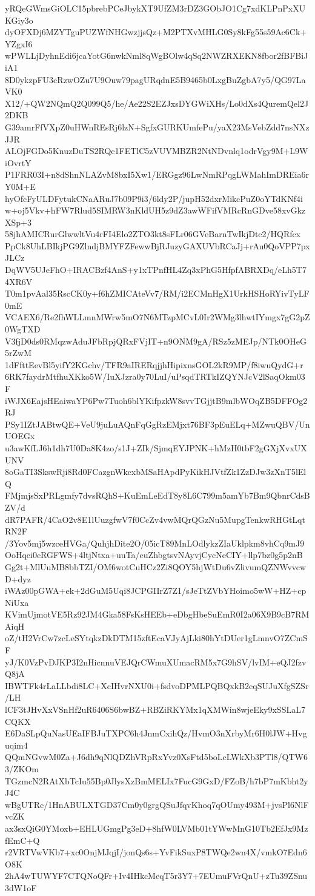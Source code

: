 yRQeGWmsGiOLC15pbrebPCeJbykXT9UfZM3rDZ3GObJO1Cg7xdKLPnPxXUKGiy3o
dyOFXDj6MZYTguPUZWfNHGwzjjsQz+M2PTXvMHLG0Sy8kFg55s59Ac6Ck+YZgxI6
wPWLLjDyhnEdi6jcaYotG6nwkNml8qWgBOlw4qSq2NWZRXEKN8fbor2fBFBiJiA1
8D0ykzpFU3cRzwOZu7U9Ouw79pagURqdnE5B9465b0LxgBuZgbA7y5/QG97LaVK0
X12/+QW2NQmQ2Q099Q5/he/Ae22S2EZJxsDYGWiXHs/Lo0dXs4QuremQel2J2DKB
G39amrFfVXpZ0uHWnREsRj6lzN+SgfxGURKUmfePu/yaX23MsVebZdd7nsNXzJJR
ALOjFGDo5KnuzDuTS2RQc1FETlC5zVUVMBZR2NtNDvnlq1odrVgy9M+L9WiOvrtY
P1FRR03I+n8dShnNLAZvM8bxI5Xw1/ERGgz96LwNmRPqgLWMahImDREia6rY0M+E
hyOfcFyULDFytukCNaARuJ7b09P9i3/6ldy2P/jupH52dxrMikcPuZ0oYTdKNf4i
w+oj5Vkv+hFW7Rlud5SIMRW3nKldUH5z9dZ3awWFifVMRcRnGDve58xvGkzXSp+3
58jhAMICRurGlwwltVu4rFI4Elo2ZTO3kt8sFLr06GVeBarnTwIkjDtc2/HQRfcx
PpCk8UhLBIkjPG9ZlndjBMYFZFewwBjRJuzyGAXUVbRCaJj+rAu0QoVPP7pxJLCz
DqWV5UJeFhO+IRACBzf4AnS+y1xTPnfHL4Zq3xPhG5HfpfABRXDq/eLh5T74XR6V
T0m1pvAal35RscCK0y+f6hZMICAteVv7/RM/i2ECMnHgX1UrkHSHoRYivTyLF0mE
VCAEX6/Re2fhWLLmnMWrw5mO7N6MTzpMCvL0Ir2WMg3lhwtIYmgx7gG2pZ0WgTXD
V3fjD0ds0RMqzwAduJFbRpjQRxFVjIT+n9ONM9gA/RSz5zMEJp/NTk0OHeG5rZwM
1dFfttEevBl5yifY2KGchv/TFR9aIRERqjjhHipixnsGOL2kR9MP/f8iwuQydG+r
6RK7faydrMtfhuXKko5W/IuXJzra0y70LuI/uPsqdTRTkIZQYNJcV2lSaqOkm03F
iWJX6EajsHEaiwaYP6Pw7Tuoh6blYKifpzkW8svvTGjjtB9mlbWOqZB5DFFOg2RJ
PSy1IZtJABtwQE+VeU9juLuAQnFqGgRzEMjxt76BF3pEuELq+MZwuQBV/UnUOEGx
u3awKfLJ6h1dh7U0Da8K4zo/s1J+ZIk/SjmqEYJPNK+hMzH0tbF2gGXjXvxUXUNV
8oGaTI3SkswRji8Rd0FCazgnWkcxbMSaHApdPyKikHJVtfZk1ZzDJw3zXnT5lElQ
FMjmjsSxPRLgmfy7dvsRQhS+KuEmLeEdT8y8L6C799m5amYb7Bm9QbnrCdsBZV/d
dR7PAFR/4CaO2v8E1lUuzgfwV7f0CcZv4vwMQrQGzNu5MupgTenkwRHGtLqtRN2F
/3Yov5mj5wzceHVGa/QuhjhDite2O/05icT89MnLOdlykzZIaUklpkm8vhCq9mJ9
OoHqei0cRGFWS+4ltjNtxa+uuTa/euZhbgtsvNAyvjCycNeCIY+llp7bz0g5p2nB
Gg2t+MlUuMB8bbTZI/OM6wotCuHCz2Zi8QOY5hjWtDu6vZlivumQZNWvvcwD+dyz
iWAz00pGWA+ek+2dGuM5Uqi8JCPGIIrZ7Z1/sJeTtZVbYHoimo5wW+HZ+cpNiUxa
KVimUjmotVE5Rz92JM4Gka58FsKsHEEb+eDbgHbeSuEmR0I2a06X9B9cB7RMAiqH
oZ/tH2VrCw7zcLeSYtqkzDkDTM15zftEcaVJyAjLki80hYtDUer1gLmnvO7ZCmSF
yJ/K0VzPvDJKP3I2nHicnnuVEJQrCWmuXUmacRM5x7G9hSV/lvIM+eQJ2fzvQ8jA
IBWTFk4rLaLLbdi8LC+XcIHvrNXU0i+fsdvoDPMLPQBQxkB2cqSUJuXfgSZSr/LH
lCF3tJHvXxVSnHf2uR6406S6bwBZ+RBZiRKYMx1qXMWin8wjeEky9xSSLaL7CQKX
E6DaSLpQuNasUEaIFBJuTXPC6h4JnmCxihQz/HvmO3nXrbyMr6H0lJW+Hvguqim4
QQmNGvwM0Za+J6dh9qNlQDZhVRpRxYvz0XsFtd5boLcLWkXb3PTl8/QTW63/ZKOm
TGzmcN2RAtXbTcIu55Bp0JlysXzBmMELIx7FucG9GxD/FZoB/h7bP7mKbht2yJ4C
wBgUTRc/1HnABULXTGD37Cm0y0grgQSuJfqvKhoq7qOUmy493M+jvsPl6NlFvcZK
ax3sxQiG0YMoxb+EHLUGmgPg3eD+8hfW0LVMb01tYWwMnG10Tb2EfJx9MzfEmC+Q
r2VRTVwVKb7+xc0OnjMJqjI/jonQs6s+YvFikSuxP8TWQe2wn4X/vmkO7Edn6O8K
2hA4wTUWYF7CTQNoQFr+Iv4IHkcMeqT5r3Y7+7EUmuFVrQnU+zTu39ZSnu3dW1oF
